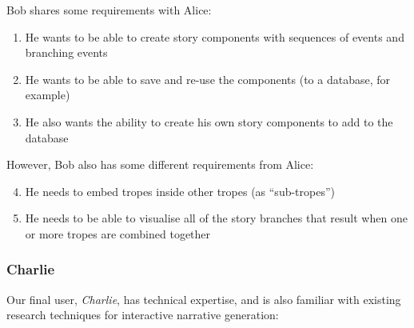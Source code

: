 \documentclass[11pt]{report}
\begin{document}
Bob shares some requirements with Alice:

\begin{enumerate}[{Bob} R1.]
  \item He wants to be able to create story components with sequences of events
    and branching events\label{req:bob1}
  \item He wants to be able to save and re-use the components (to a database,
    for example)\label{req:bob2}
  \item He also wants the ability to create his own story components to add to
    the database\label{req:bob3}
\end{enumerate}

However, Bob also has some different requirements from Alice:

\begin{enumerate}[{Bob} R1.]
  \setcounter{enumi}{3}
  \item He needs to embed tropes inside other tropes (as ``sub-tropes'')\label{req:bob4}
  \item He needs to be able to visualise all of the story branches that result
    when one or more tropes are combined together\label{req:bob5}
\end{enumerate}

\subsubsection{Charlie}

Our final user, \emph{Charlie}, has technical expertise, and is also familiar with
existing research techniques for interactive narrative generation:
\end{document}
